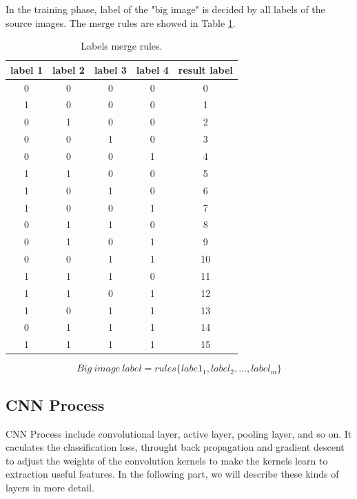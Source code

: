 \documentclass[sensors,article,submit,moreauthors,pdftex,10pt,a4paper]{mdpi}
\begin{document}
In the training phase, label of the "big image" is decided by all labels of the source images. The merge rules are showed in Table \ref{LabelsMergeRules}.

\begin{table}[H]
\caption{Labels merge rules.}
\centering
\begin{tabular}{cccc|c}
\toprule
\textbf{label 1}	& \textbf{label 2}	& \textbf{label 3}	& \textbf{label 4}	& \textbf{result label}\\
\midrule
0		& 0			& 0				&0					&0\\
1		& 0			& 0				&0					&1\\
0		& 1			& 0				&0					&2\\
0		& 0			& 1				&0					&3\\
0		& 0			& 0				&1					&4\\
1		& 1			& 0				&0					&5\\
1		& 0			& 1				&0					&6\\
1		& 0			& 0				&1					&7\\
0		& 1			& 1				&0					&8\\
0		& 1			& 0				&1					&9\\
0		& 0			& 1				&1					&10\\
1		& 1			& 1				&0					&11\\
1		& 1			& 0				&1					&12\\
1		& 0			& 1				&1					&13\\
0		& 1			& 1				&1					&14\\
1		& 1			& 1				&1					&15\\
\bottomrule
\end{tabular}
\label{LabelsMergeRules}
\end{table}

\begin{equation}
Big\ image\ label = rules\{labe1_1, label_2, ..., label_m\}
\end{equation}

\subsection{CNN Process}
 
CNN Process include convolutional layer, active layer, pooling layer, and so on. It caculates the classification loss, throught back propagation and gradient descent to adjust the weights of the convolution kernels to make the kernels learn to extraction useful features. In the following part, we will describe these kinds of layers in more detail. 
\end{document}
